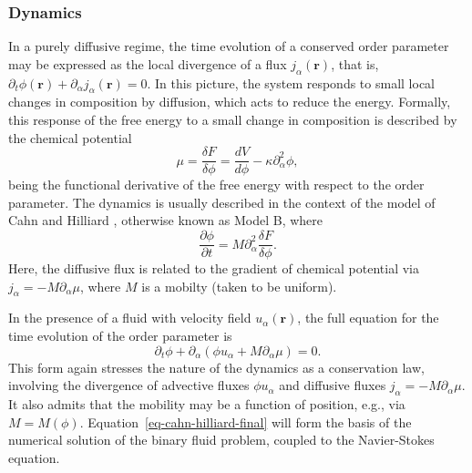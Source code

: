 \subsubsection{Dynamics}

In a purely diffusive regime, the time evolution of a conserved
order parameter may be expressed as the local divergence of a flux
$j_\alpha(\mathbf{r})$, that is,
$\partial_t \phi(\mathbf{r}) + \partial_\alpha j_\alpha(\mathbf{r}) = 0$.
In this picture, the system responds to small local changes in composition
by diffusion, which acts to reduce the energy. Formally, this
response of the free energy to a small change in composition is described
by the chemical potential
\begin{equation}
\mu = \frac{\delta F}{\delta \phi} = \frac{dV}{d\phi} - \kappa \partial_\alpha^2 \phi,
\end{equation}
being the functional derivative of the free energy with respect to the
order parameter. The dynamics is usually described in the context of the
model of Cahn and Hilliard \cite{cahn-hilliard-1958}, otherwise known as
Model B, where
\begin{equation}
\frac{\partial \phi}{\partial t} =
M\partial_\alpha^2 \frac{\delta F}{\delta \phi}.
\label{eq-cahn-hilliard}
\end{equation}
Here, the diffusive flux is related to the gradient of chemical potential
via $j_\alpha = -M \partial_\alpha \mu$, where $M$ is a mobilty
(taken to be uniform). 

In the presence of a fluid with velocity field $u_\alpha(\mathbf{r})$,
the full equation for the time evolution of the order parameter is
\begin{equation}
\partial_t \phi + \partial_\alpha (\phi u_\alpha + M\partial_\alpha \mu) = 0.
\label{eq-cahn-hilliard-final}
\end{equation}
This form again stresses the nature of the dynamics as a conservation law,
involving the divergence of advective fluxes $\phi u_\alpha$ and diffusive
fluxes $j_\alpha = -M\partial_\alpha \mu$. It
also admits that the mobility may be a function of position, e.g., via
$M = M(\phi)$. Equation~\ref{eq-cahn-hilliard-final} will form the basis of
the numerical solution of the binary fluid problem, coupled to the
Navier-Stokes equation.

